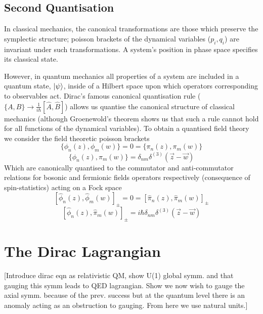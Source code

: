 \documentclass[11pt, a4paper]{article}
\theoremstyle{definition}
\theoremstyle{plain}
\begin{document}
\subsection{Second Quantisation}
In classical mechanics, the canonical transformations are those which preserve the symplectic 
structure; poisson brackets of the dynamical variables ($p_i, q_i$) are invariant under such 
transformations. A system's position in phase space specifies its classical state.

However, in quantum mechanics all properties of a system are included in a quantum state, $\ket{\psi}$, 
inside of a Hilbert space upon which operators corresponding to observables act.
Dirac's famous canonical quantisation
rule (${\{A, B \} \rightarrow \frac{1}{i\hbar}[\hat{A}, \hat{B}]}$) allows us quantise 
the canonical structure of classical mechanics (although Groenewold's theorem shows us 
that such a rule cannot hold for all functions of the dynamical variables). 
To obtain a quantised field theory we consider the field theoretic poisson brackets
\begin{equation}
  \{ \phi_n(z), \phi_m(w) \} = 0 = \{ \pi_n(z), \pi_m(w) \}
\end{equation}
\begin{equation}
  \{\phi_n(z), \pi_m(w) \} = \delta_{nm}\delta^{(3)}(\vec{z} - \vec{w})
\end{equation}
Which are canonically quantised to the commutator and anti-commutator relations 
for bosonic and fermionic fields operators respectively (consequence of spin-statistics)
acting on a Fock space
\begin{equation}
  {[\hat{\phi}_n(z), \hat{\phi}_m(w) ]}_\pm = 0
  = {[\hat{\pi}_n(z), \hat{\pi}_m(w) ]}_\pm
\end{equation}
\begin{equation}
  {[ \hat{\phi}_n(z), \hat{\pi}_m(w) ]}_\pm
  = i\hbar\delta_{nm}\delta^{(3)}(\vec{z} - \vec{w})
\end{equation}

\section{The Dirac Lagrangian}
[Introduce dirac eqn as relativistic QM,
show U(1) global symm. and that gauging this symm leads to QED lagrangian.
Show we now wish to gauge the axial symm. because of the prev. success but 
at the quantum level there is an anomaly acting as an obstruction to gauging.
From here we use natural units.]
\end{document}

